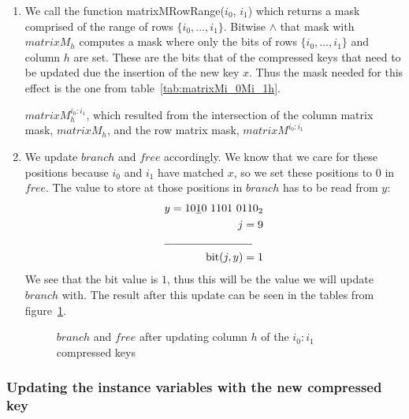 \begin{enumerate}
    \item
    We call the function {\ttfamily matrixMRowRange($i_0$, $i_1$)} which returns a mask comprised of the range of rows $\{ i_0, \dots, i_1 \}$. Bitwise $\wedge$ that mask with $matrixM_h$ computes a mask where only the bits of rows $\{ i_0, \dots, i_1 \}$ and column $h$ are set. These are the bits that of the compressed keys that need to be updated due the insertion of the new key $x$. Thus the mask needed for this effect is the one from table~\ref{tab:matrixMi_0Mi_1h}.
    \begin{table}[H]
    \centering
    
    \caption[Example of the intersection of column matrix mask, $matrixM_1$, with the row matrix mask $matrixM^{2:3}$, resulting in the mask $matrixM^{2:3}_1$]{$matrixM^{i_0:i_1}_h$, which resulted from the intersection of the column matrix mask, $matrixM_h$, and the row matrix mask, $matrixM^{i_0:i_1}$}
    \label{tab:matrixMi_0Mi_1h}
    \end{table}
    
    \item
    We update $branch$ and $free$ accordingly. We know that we care for these positions because $i_0$ and $i_1$ have matched $x$, so we set these positions to $0$ in $free$. The value to store at those positions in $branch$ has to be read from $y$:
    \begin{align*}
        y = 10\underline{1}0\ 1101\ 0110_2 \\
        j = 9 \\
        \cline{1-2}
        \text{bit}(j, y) = 1
    \end{align*}
    We see that the bit value is $1$, thus this will be the value we will update $branch$ with. The result after this update can be seen in the tables from figure~\ref{fig:branchAndFreeAfterMatrixMi_0Mi_1h}.
    \begin{figure}[H]
    \centering
    
    \caption[Example of $branch$ and $free$ after updating column $1$ in rows $2$ and $3$]{$branch$ and $free$ after updating column $h$ of the $i_0:i_1$ compressed keys}
    \label{fig:branchAndFreeAfterMatrixMi_0Mi_1h}
    \end{figure}
\end{enumerate}

\subsubsection{Updating the instance variables with the new compressed key} \label{sec:updateRankRow}

